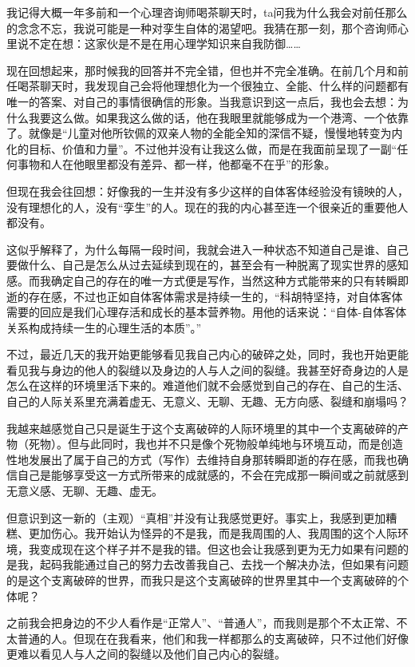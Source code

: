我记得大概一年多前和一个心理咨询师喝茶聊天时，ta问我为什么我会对前任那么的念念不忘，我说可能是一种对孪生自体的渴望吧。我猜在那一刻，那个咨询师心里说不定在想：这家伙是不是在用心理学知识来自我防御……

现在回想起来，那时候我的回答并不完全错，但也并不完全准确。在前几个月和前任喝茶聊天时，我发现自己会将他理想化为一个很独立、全能、什么样的问题都有唯一的答案、对自己的事情很确信的形象。当我意识到这一点后，我也会去想：为什么我要这么做。如果我这么做的话，他在我眼里就能够成为一个港湾、一个依靠了。就像是“儿童对他所钦佩的双亲人物的全能全知的深信不疑，慢慢地转变为内化的目标、价值和力量”。不过他并没有让我这么做，而是在我面前呈现了一副“任何事物和人在他眼里都没有差异、都一样，他都毫不在乎”的形象。

但现在我会往回想：好像我的一生并没有多少这样的自体客体经验\pozhehao{}没有镜映的人，没有理想化的人，没有“孪生”的人。现在的我的内心甚至连一个很亲近的重要他人都没有。

这似乎解释了，为什么每隔一段时间，我就会进入一种状态\pozhehao{}不知道自己是谁、自己要做什么、自己是怎么从过去延续到现在的，甚至会有一种脱离了现实世界的感知感。而我确定自己的存在的唯一方式便是写作，当然这种方式能带来的只有转瞬即逝的存在感，不过也正如自体客体需求是持续一生的，“科胡特坚持，对自体客体需要的回应是我们心理存活和成长的基本营养物。用他的话来说：“自体-自体客体关系构成持续一生的心理生活的本质”。”

不过，最近几天的我开始更能够看见我自己内心的破碎之处，同时，我也开始更能看见我与身边的他人的裂缝以及身边的人与人之间的裂缝。我甚至好奇身边的人是怎么在这样的环境里活下来的。难道他们就不会感觉到自己的存在、自己的生活、自己的人际关系里充满着虚无、无意义、无聊、无趣、无方向感、裂缝和崩塌吗？

我越来越感觉自己只是诞生于这个支离破碎的人际环境里的其中一个支离破碎的产物（死物）。但与此同时，我也并不只是像个死物般单纯地与环境互动，而是创造性地发展出了属于自己的方式（写作）去维持自身那转瞬即逝的存在感，而我也确信自己是能够享受这一方式所带来的成就感的，不会在完成那一瞬间或之前就感到无意义感、无聊、无趣、虚无。

但意识到这一新的（主观）“真相”并没有让我感觉更好。事实上，我感到更加糟糕、更加伤心。我开始认为怪异的不是我，而是我周围的人、我周围的这个人际环境，我变成现在这个样子并不是我的错。但这也会让我感到更为无力\pozhehao{}如果有问题的是我，起码我能通过自己的努力去改善我自己、去找一个解决办法，但如果有问题的是这个支离破碎的世界，而我只是这个支离破碎的世界里其中一个支离破碎的个体呢？

之前我会把身边的不少人看作是“正常人”、“普通人”，而我则是那个不太正常、不太普通的人。但现在在我看来，他们和我一样都那么的支离破碎，只不过他们好像更难以看见人与人之间的裂缝以及他们自己内心的裂缝。


